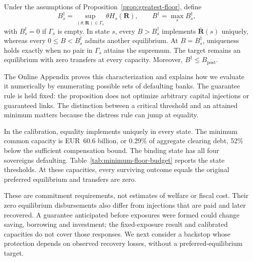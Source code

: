 \begin{proposition}\label{prop:critical-floor-budget}
Under the assumptions of Proposition~\ref{prop:greatest-floor}, define
\[
 B_s^\dagger=\sup_{(\theta,\mathbf{R})\in\Gamma_s}\theta H_s(\mathbf{R}),
 \qquad B^\dagger=\max_s B_s^\dagger,
\]
with $B_s^\dagger=0$ if $\Gamma_s$ is empty. In state $s$, every $B>B_s^\dagger$ implements $\bar{\mathbf{R}}(s)$ uniquely, whereas every $0\leq B<B_s^\dagger$ admits another equilibrium. At $B=B_s^\dagger$, uniqueness holds exactly when no pair in $\Gamma_s$ attains the supremum. The target remains an equilibrium with zero transfers at every capacity. Moreover, $B^\dagger\leq B_{\mathrm{post}}$.
\end{proposition}


The Online Appendix proves this characterization and explains how we evaluate it numerically by enumerating possible sets of defaulting banks. The guarantee rule is held fixed: the proposition does not optimize arbitrary capital injections or guaranteed links. The distinction between a critical threshold and an attained minimum matters because the distress rule can jump at equality.

In the calibration, equality implements uniquely in every state. The minimum common capacity is EUR~60.6 billion, or 0.29\% of aggregate clearing debt, 52\% below the sufficient compensation bound. The binding state has all four sovereigns defaulting. Table~\ref{tab:minimum-floor-budget} reports the state thresholds. At these capacities, every surviving outcome equals the original preferred equilibrium and transfers are zero.

\begin{table}[htbp]
\centering
{}
\label{tab:minimum-floor-budget}



\end{table}


These are commitment requirements, not estimates of welfare or fiscal cost. Their zero equilibrium disbursements also differ from injections that are paid and later recovered. A guarantee anticipated before exposures were formed could change saving, borrowing and investment; the fixed-exposure result and calibrated capacities do not cover those responses. We next consider a backstop whose protection depends on observed recovery losses, without a preferred-equilibrium target.
